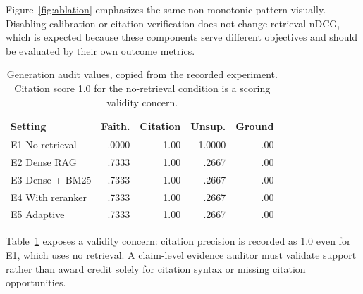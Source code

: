 \documentclass[journal,twoside]{IEEEtran}
\begin{document}
Figure~\ref{fig:ablation} emphasizes the same non-monotonic pattern visually. Disabling calibration or citation verification does not change retrieval nDCG, which is expected because these components serve different objectives and should be evaluated by their own outcome metrics.



\begin{table}[!t]
\caption{Generation audit values, copied from the recorded experiment. Citation score 1.0 for the no-retrieval condition is a scoring validity concern.}
\label{tab:gen}\centering\scriptsize
\setlength{\tabcolsep}{3pt}
\begin{tabular}{p{}rrrr}
\toprule Setting & Faith. & Citation & Unsup. & Ground\\\midrule
E1 No retrieval & .0000 & 1.00 & 1.0000 & .00\\
E2 Dense RAG & .7333 & 1.00 & .2667 & .00\\
E3 Dense + BM25 & .7333 & 1.00 & .2667 & .00\\
E4 With reranker & .7333 & 1.00 & .2667 & .00\\
E5 Adaptive & .7333 & 1.00 & .2667 & .00\\\bottomrule
\end{tabular}
\end{table}

Table~\ref{tab:gen} exposes a validity concern: citation precision is recorded as 1.0 even for E1, which uses no retrieval. A claim-level evidence auditor must validate support rather than award credit solely for citation syntax or missing citation opportunities.
\end{document}
